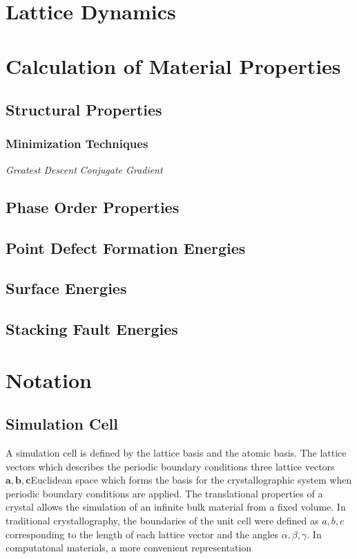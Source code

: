 \section{Lattice Dynamics}
\section{Calculation of Material Properties}
\subsection{Structural Properties}
\subsubsection{Minimization Techniques}
\emph{Greatest Descent}
\emph{Conjugate Gradient}
\subsection{Phase Order Properties}
\subsection{Point Defect Formation Energies}
\subsection{Surface Energies}
\subsection{Stacking Fault Energies}

\section{Notation}
\subsection{Simulation Cell}
A simulation cell is defined by the lattice basis and the atomic basis.  The lattice vectors which describes the periodic boundary conditions three lattice vectors $\bm{a},\bm{b},\bm{c}$Euclidean space which forms the basis for the crystallographic system when periodic boundary conditions are applied.  The translational properties of a crystal allows the simulation of an infinite bulk material from a fixed volume.  In traditional crystallography, the boundaries of the unit cell were defined as $a,b,c$ corresponding to the length of each lattice vector and the angles $\alpha,\beta,\gamma$.  In computatonal materials, a more convenient representation
